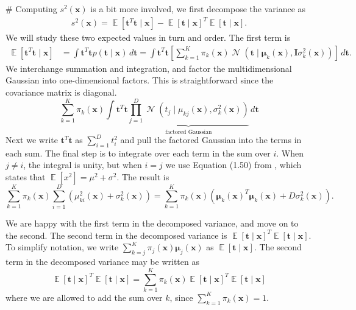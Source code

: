 \documentclass[12pt, a4paper]{article}
\newcommand{\vect}[1]{\bm{#1}}
\DeclareMathOperator{\N}{\mathcal{N}}
\DeclareMathOperator{\E}{\mathbb{E}}
\begin{document}
\begin{easylist}[enumerate]
	# Computing $s^2 (\vect{x})$ is a bit more involved, we first decompose the variance as
	\begin{align*}
	s^2 (\vect{x}) = \E \left[ \vect{t}^T \vect{t} \mid \vect{x} \right] - 
	\E \left[ \vect{t} \mid \vect{x} \right]^T
	\E \left[ \vect{t} \mid \vect{x} \right].
	\end{align*}
	We will study these two expected values in turn and order.
	The first term is
	\begin{align*}
		\E \left[ \vect{t}^T \vect{t}\mid \vect{x }\right] &= 
		\int \vect{t}^T \vect{t} p (\vect{t} \mid \vect{x}) \, d\vect{t}
		= \int \vect{t}^T \vect{t}
		\left[ 
		\sum_{k=1}^{K} \pi_k (\vect{x}) 
		\N \left( \vect{t} \mid \vect{\mu}_k (\vect{x}) , \vect{I} \sigma_k^2(\vect{x}) \right)
		\right] 
		\, d\vect{t}.
	\end{align*}
	We interchange summation and integration, and factor the multidimensional Gaussian into one-dimensional factors.
	This is straightforward since the covariance matrix is diagonal.
	\begin{equation*}
		\sum_{k=1}^{K} \pi_k (\vect{x}) 
		\int \vect{t}^T \vect{t} 
		\underbrace{\prod_{j=1}^{D} 
		\N \left( t_j \mid \mu_{kj} (\vect{x}),  \sigma_k^2(\vect{x}) \right)}_{\text{factored Gaussian}}
		\, d\vect{t}
	\end{equation*}
	Next we write $\vect{t}^T \vect{t} $ as $\sum_{i=1}^{D} t_i^2$ and pull the factored Gaussian into the terms in each sum.
	The final step is to integrate over each term in the sum over $i$.
	When $j \neq i$, the integral is unity, but when $i = j$ we use Equation (1.50) from \cite{bishop_pattern_2011}, which states that $\E[x^2] = \mu^2 + \sigma^2$.
	The result is
	\begin{equation}
	\label{eqn:ch5_37_a}
		\sum_{k=1}^{K} \pi_k (\vect{x}) 
		\sum_{i=1}^{D} \left( \mu_{ki}^2 (\vect{x}) + \sigma_k^2(\vect{x}) \right)
		=
		\sum_{k=1}^{K} \pi_k (\vect{x}) 
		\left( \vect{\mu}_k(\vect{x})^T \vect{\mu}_k(\vect{x}) + D \sigma_k^2(\vect{x}) \right).
	\end{equation}
	
	We are happy with the first term in the decomposed variance, and move on to the second.
	The second term in the decomposed variance is $\E \left[ \vect{t} \mid \vect{x} \right]^T
	\E \left[ \vect{t} \mid \vect{x} \right]$.
	To simplify notation, we write $\sum_{k=j}^{K} \pi_j (\vect{x}) \vect{\mu}_j (\vect{x})$ as $\E \left[ \vect{t} \mid \vect{x} \right]$.
	The second term in the decomposed variance may be written as
	\begin{equation}
		\label{eqn:ch5_37_b}
		\E \left[ \vect{t} \mid \vect{x} \right]^T
		\E \left[ \vect{t} \mid \vect{x} \right]
		=
		\sum_{k=1}^{K} \pi_k (\vect{x})
		\E \left[ \vect{t} \mid \vect{x} \right]^T
		\E \left[ \vect{t} \mid \vect{x} \right]
	\end{equation}
	where we are allowed to add the sum over $k$, since $\sum_{k=1}^{K} \pi_k (\vect{x}) = 1$.
	

\end{easylist}
\end{document}
